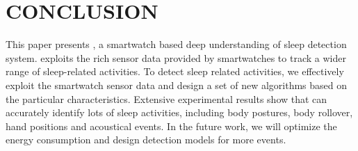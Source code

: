 \documentclass[conference]{sigchi}
\begin{document}








\section{CONCLUSION}
This paper presents \systemname, a smartwatch based deep understanding of sleep detection system. \systemname exploits the rich sensor data provided by smartwatches to track a wider range of sleep-related activities. To detect sleep related activities, we effectively exploit the smartwatch sensor data and design a set of new algorithms based on the particular characteristics. Extensive experimental results show that \systemname can accurately identify lots of sleep activities, including body postures, body rollover, hand positions and acoustical events. In the future work, we will optimize the energy consumption and design detection models for more events.

\begin{small}


\end{small}
\end{document}
